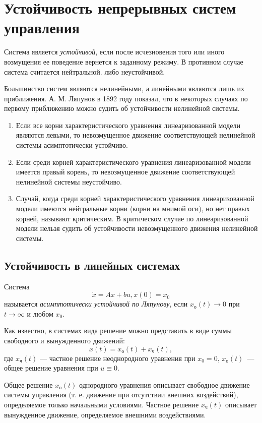 \documentclass[../../TAU.tex]{subfiles}
\begin{document}
\chapter{Устойчивость непрерывных систем управления}

     Система является {\it устойчивой}, если после исчезновения того или иного возмущения ее поведение вернется к заданному режиму. В противном случае система считается нейтральной. либо неустойчивой. \par
    Большинство систем являются нелинейными, а линейными являются лишь их приближения. А. М. Ляпунов в 1892 году показал, что в некоторых случаях по первому приближению можно судить об устойчивости нелинейной системы.

    \begin{enumerate}
        \item Если все корни характеристического уравнения линеаризованной модели являются левыми, то невозмущенное движение соответствующей нелинейной системы асимптотически устойчиво.
        \item Если среди корней характеристического уравнения линеаризованной модели имеется правый корень, то невозмущенное движение соответствующей нелинейной системы неустойчиво.
        \item Случай, когда среди корней характеристического уравнения линеаризованной модели имеются нейтральные корни (корни на мнимой оси), но нет правых корней, называют критическим. В критическом случае по линеаризованной модели нельзя судить об устойчивости невозмущенного движения нелинейной системы. 

    \end{enumerate}

\section{Устойчивость в линейных системах}

    Система 
    \begin{equation}\label{LIN_DS}
        \dot x = Ax + bu, x(0) = x_0
    \end{equation} 
    называется 
    {\it асимптотически устойчивой по Ляпунову}, если 
    $x_\text{о}(t)\rightarrow0$ 
    при 
    $t\rightarrow\infty$ 
    и любом $x_0$.\par
    Как известно, в системах вида
    решение можно представить в виде суммы свободного и вынужденного движений:
    $$
        x(t) = x_\text{о}(t) + x_\text{ч}(t),
    $$
    где $x_\text{ч}(t)$ --- частное решение неоднородного уравнения при 
    $x_0 = 0$, $x_\text{о}(t)$~--- общее решение уравнения при 
    $u\equiv0$.
    \par
    Общее решение $x_\text{о}(t)$ однородного уравнения описывает свободное движение системы управления (т. е. движение при отсутствии внешних воздействий), определяемое только начальными условиями. Частное решение $x_\text{ч}(t)$ описывает вынужденное движение, определяемое внешними воздействиями.
\end{document}
